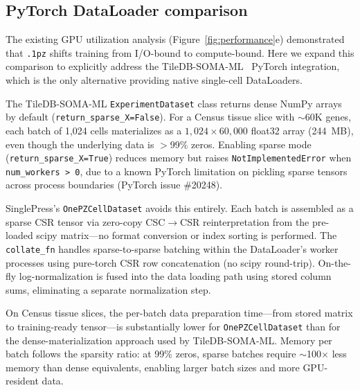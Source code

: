 \documentclass[10pt,twocolumn,letterpaper]{article}
\begin{document}
\subsection{PyTorch DataLoader comparison}

The existing GPU utilization analysis (Figure~\ref{fig:performance}e) demonstrated that \texttt{.1pz} shifts training from I/O-bound to compute-bound.
Here we expand this comparison to explicitly address the TileDB-SOMA-ML~\cite{tiledbsoma_ml} PyTorch integration, which is the only alternative providing native single-cell DataLoaders.

The TileDB-SOMA-ML \texttt{ExperimentDataset} class returns dense NumPy arrays by default (\texttt{return\_sparse\_X=False}).
For a Census tissue slice with $\sim$60K genes, each batch of 1{,}024 cells materializes as a $1{,}024 \times 60{,}000$ float32 array (244~MB), even though the underlying data is $>$99\% zeros.
Enabling sparse mode (\texttt{return\_sparse\_X=True}) reduces memory but raises \texttt{NotImplementedError} when \texttt{num\_workers > 0}, due to a known PyTorch limitation on pickling sparse tensors across process boundaries (PyTorch issue \#20248).

SinglePress's \texttt{OnePZCellDataset} avoids this entirely.
Each batch is assembled as a sparse CSR tensor via zero-copy CSC$\to$CSR reinterpretation from the pre-loaded scipy matrix---no format conversion or index sorting is performed.
The \texttt{collate\_fn} handles sparse-to-sparse batching within the DataLoader's worker processes using pure-torch CSR row concatenation (no scipy round-trip).
On-the-fly log-normalization is fused into the data loading path using stored column sums, eliminating a separate normalization step.

On Census tissue slices, the per-batch data preparation time---from stored matrix to training-ready tensor---is substantially lower for \texttt{OnePZCellDataset} than for the dense-materialization approach used by TileDB-SOMA-ML.
Memory per batch follows the sparsity ratio: at 99\% zeros, sparse batches require $\sim$100$\times$ less memory than dense equivalents, enabling larger batch sizes and more GPU-resident data.
\end{document}

